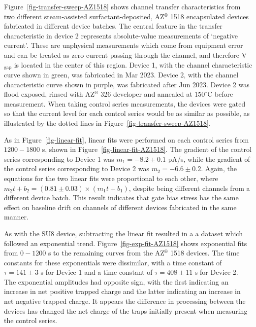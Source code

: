 \documentclass[
  a4paper,
]{scrbook}
\begin{document}
Figure~\ref{fig-transfer-sweep-AZ1518} shows channel transfer
characteristics from two different steam-assisted surfactant-deposited,
AZ\(^\circledR\) 1518 encapsulated devices fabricated in different
device batches. The central feature in the transfer characteristic in
device 2 represents absolute-value measurements of `negative current'.
These are unphysical measurements which come from equipment error and
can be treated as zero current passing through the channel, and
therefore V\(_{\textrm{gap}}\) is located in the center of this region.
Device 1, with the channel characteristic curve shown in green, was
fabricated in Mar 2023. Device 2, with the channel characteristic curve
shown in purple, was fabricated after Jun 2023. Device 2 was flood
exposed, rinsed with AZ\(^\circledR\) 326 developer and annealed at
\(150^\circ\)C before measurement. When taking control series
measurements, the devices were gated so that the current level for each
control series would be as similar as possible, as illustrated by the
dotted lines in Figure~\ref{fig-transfer-sweep-AZ1518}.

As in Figure~\ref{fig-linear-fit}, linear fits were performed on each
control series from \(1200-1800\) s, shown in
Figure~\ref{fig-linear-fit-AZ1518}. The gradient of the control series
corresponding to Device 1 was \(m_{1} = -8.2\pm0.1\) pA/s, while the
gradient of the control series corresponding to Device 2 was
\(m_{2} = -6.6\pm0.2\). Again, the equations for the two linear fits
were proportional to each other, where
\(m_{2}t + b_{2} = (0.81 \pm 0.03)\times (m_{1}t + b_{1})\), despite
being different channels from a different device batch. This result
indicates that gate bias stress has the same effect on baseline drift on
channels of different devices fabricated in the same manner.

As with the SU8 device, subtracting the linear fit resulted in a a
dataset which followed an exponential trend.
Figure~\ref{fig-exp-fit-AZ1518} shows exponential fits from \(0-1200\) s
to the remaining curves from the AZ\(^\circledR\) 1518 devices. The time
constants for these exponentials were dissimilar, with a time constant
of \(\tau = 141 \pm 3\) s for Device 1 and a time constant of
\(\tau = 408 \pm 11\) s for Device 2. The exponential amplitudes had
opposite sign, with the first indicating an increase in net positive
trapped charge and the latter indicating an increase in net negative
trapped charge. It appears the difference in processing between the
devices has changed the net charge of the traps initially present when
measuring the control series.
\end{document}
